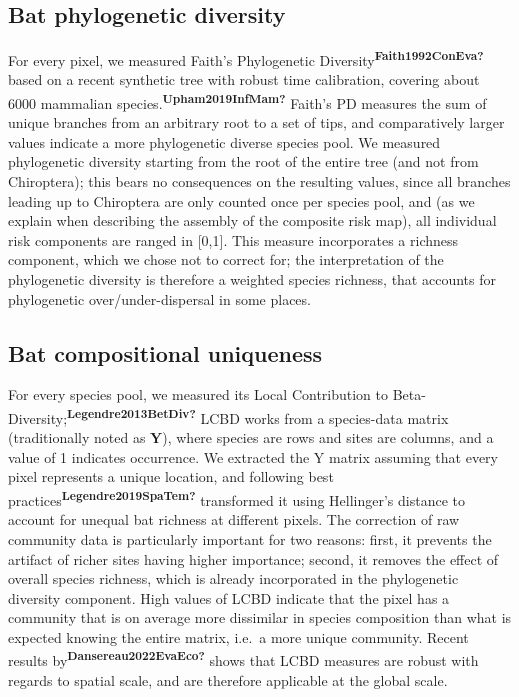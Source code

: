 \documentclass[10pt,oneside]{article}
\begin{document}
\hypertarget{bat-phylogenetic-diversity}{%
\subsection{Bat phylogenetic
diversity}\label{bat-phylogenetic-diversity}}

For every pixel, we measured Faith's Phylogenetic
Diversity\textsuperscript{\textbf{Faith1992ConEva?}} based on a recent
synthetic tree with robust time calibration, covering about 6000
mammalian species.\textsuperscript{\textbf{Upham2019InfMam?}} Faith's PD
measures the sum of unique branches from an arbitrary root to a set of
tips, and comparatively larger values indicate a more phylogenetic
diverse species pool. We measured phylogenetic diversity starting from
the root of the entire tree (and not from Chiroptera); this bears no
consequences on the resulting values, since all branches leading up to
Chiroptera are only counted once per species pool, and (as we explain
when describing the assembly of the composite risk map), all individual
risk components are ranged in {[}0,1{]}. This measure incorporates a
richness component, which we chose not to correct for; the
interpretation of the phylogenetic diversity is therefore a weighted
species richness, that accounts for phylogenetic over/under-dispersal in
some places.

\hypertarget{bat-compositional-uniqueness}{%
\subsection{Bat compositional
uniqueness}\label{bat-compositional-uniqueness}}

For every species pool, we measured its Local Contribution to
Beta-Diversity;\textsuperscript{\textbf{Legendre2013BetDiv?}} LCBD works
from a species-data matrix (traditionally noted as \(\mathbf{Y}\)),
where species are rows and sites are columns, and a value of 1 indicates
occurrence. We extracted the Y matrix assuming that every pixel
represents a unique location, and following best
practices\textsuperscript{\textbf{Legendre2019SpaTem?}} transformed it
using Hellinger's distance to account for unequal bat richness at
different pixels. The correction of raw community data is particularly
important for two reasons: first, it prevents the artifact of richer
sites having higher importance; second, it removes the effect of overall
species richness, which is already incorporated in the phylogenetic
diversity component. High values of LCBD indicate that the pixel has a
community that is on average more dissimilar in species composition than
what is expected knowing the entire matrix, i.e.~a more unique
community. Recent results
by\textsuperscript{\textbf{Dansereau2022EvaEco?}} shows that LCBD
measures are robust with regards to spatial scale, and are therefore
applicable at the global scale.
\end{document}
